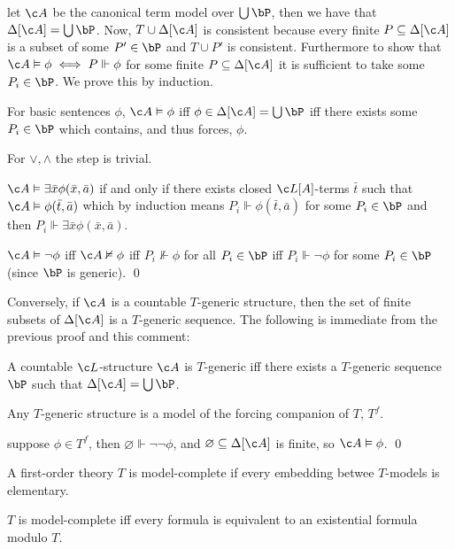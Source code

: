 \Proof let $\c A$ be the canonical term model over $\bigcup\bP$, then we have that $\Delta[\c A]=\bigcup\bP$.
Now, $T\cup\Delta[\c A]$ is consistent because every finite $P\subseteq\Delta[\c A]$ is a subset of some $P'\in\bP$ and $T\cup P'$ is consistent.
Furthermore to show that $\c A\vDash\phi\iff P\Vdash\phi$ for some finite $P\subseteq\Delta[\c A]$ it is sufficient to take some $P_i\in\bP$.
We prove this by induction.
\benum
    \item For basic sentences $\phi$, $\c A\vDash\phi$ iff $\phi\in\Delta[\c A]=\bigcup\bP$ iff there exists some $P_i\in\bP$ which contains, and thus forces, $\phi$.
    \item For $\lor,\land$ the step is trivial.
    \item $\c A\vDash\exists\bar x\phi(\bar x,\bar a)$ if and only if there exists closed $\c L[A]$-terms $\bar t$ such that $\c A\vDash\phi(\bar t,\bar a)$ which by induction means
    $P_i\Vdash\phi(\bar t,\bar a)$ for some $P_i\in\bP$ and then $P_i\Vdash\exists\bar x\phi(\bar x,\bar a)$.
    \item $\c A\vDash\neg\phi$ iff $\c A\nvDash\phi$ iff $P_i\nVdash\phi$ for all $P_i\in\bP$ iff $P_i\Vdash\neg\phi$ for some $P_i\in\bP$ (since $\bP$ is generic).
    \qed
\eenum

Conversely, if $\c A$ is a countable $T$-generic structure, then the set of finite subsets of $\Delta[\c A]$ is a $T$-generic sequence.
The following is immediate from the previous proof and this comment:

\bcoro

    A countable $\c L$-structure $\c A$ is $T$-generic iff there exists a $T$-generic sequence $\bP$ such that $\Delta[\c A]=\bigcup\bP$.

\ecoro

\blemm[name=lemm4.1]

    Any $T$-generic structure is a model of the forcing companion of $T$, $T^f$.

\elemm

\Proof suppose $\phi\in T^f$, then $\varnothing\Vdash\neg\neg\phi$, and $\varnothing\subseteq\Delta[\c A]$ is finite, so $\c A\vDash\phi$.
\qed

\bdefn

    A first-order theory $T$ is {\emphcolor model-complete} if every embedding betwee $T$-models is elementary.

\edefn

\bthrm[name=robinsontest]

    $T$ is model-complete iff every formula is equivalent to an existential formula modulo $T$.

